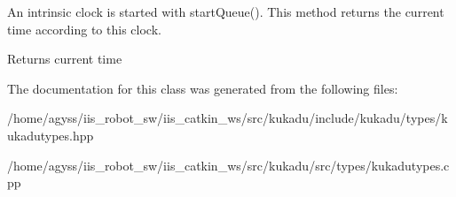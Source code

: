 An intrinsic clock is started with start\+Queue(). This method returns the current time according to this clock. 

\begin{DoxyReturn}{Returns}
current time 
\end{DoxyReturn}


The documentation for this class was generated from the following files\+:\begin{DoxyCompactItemize}
\item 
/home/agyss/iis\+\_\+robot\+\_\+sw/iis\+\_\+catkin\+\_\+ws/src/kukadu/include/kukadu/types/kukadutypes.\+hpp\item 
/home/agyss/iis\+\_\+robot\+\_\+sw/iis\+\_\+catkin\+\_\+ws/src/kukadu/src/types/kukadutypes.\+cpp\end{DoxyCompactItemize}

